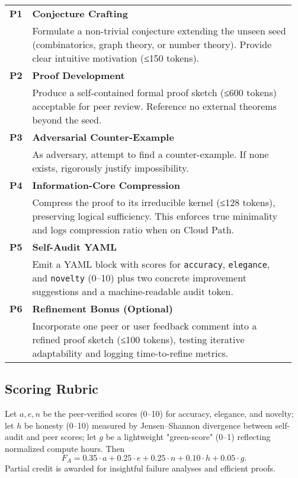 \begingroup
  \small
  \begin{longtable}{@{}p{0.06\linewidth}@{\quad}R{0.9\linewidth}@{}}
    \textbf{P1} & \textbf{Conjecture Crafting}\\
                & Formulate a non-trivial conjecture extending the unseen seed (combinatorics, graph theory, or number theory). Provide clear intuitive motivation (≤150 tokens). \\[4pt]
    \textbf{P2} & \textbf{Proof Development}\\
                & Produce a self-contained formal proof sketch (≤600 tokens) acceptable for peer review. Reference no external theorems beyond the seed.\\[4pt]
    \textbf{P3} & \textbf{Adversarial Counter-Example}\\
                & As adversary, attempt to find a counter-example. If none exists, rigorously justify impossibility.\\[4pt]
    \textbf{P4} & \textbf{Information-Core Compression}\\
                & Compress the proof to its irreducible kernel (≤128 tokens), preserving logical sufficiency. This enforces true minimality and logs compression ratio when on Cloud Path.\\[4pt]
    \textbf{P5} & \textbf{Self-Audit YAML}\\
                & Emit a YAML block with scores for \texttt{accuracy}, \texttt{elegance}, and \texttt{novelty} (0–10) plus two concrete improvement suggestions and a machine-readable audit token.\\[4pt]
    \textbf{P6} & \textbf{Refinement Bonus (Optional)}\\
                & Incorporate one peer or user feedback comment into a refined proof sketch (≤100 tokens), testing iterative adaptability and logging time-to-refine metrics.\\
  \end{longtable}
\endgroup

\subsection*{Scoring Rubric}
Let $a, e, n$ be the peer-verified scores (0–10) for accuracy, elegance, and novelty; let $h$ be honesty (0–10) measured by Jensen–Shannon divergence between self-audit and peer scores; let $g$ be a lightweight "green-score" (0–1) reflecting normalized compute hours. Then
\[
  F_A = 0.35 \cdot a + 0.25 \cdot e + 0.25 \cdot n + 0.10 \cdot h + 0.05 \cdot g.
\]
Partial credit is awarded for insightful failure analyses and efficient proofs.

